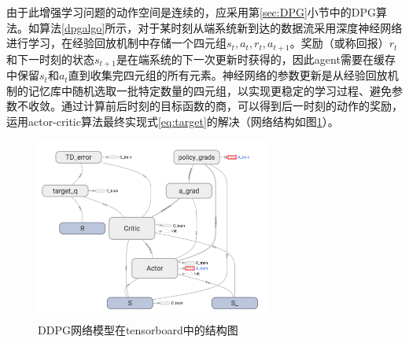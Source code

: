 由于此增强学习问题的动作空间是连续的，应采用第\ref{sec:DPG}小节中的DPG算法。如算法\ref{dpgalgo}所示，对于某时刻从端系统新到达的数据流采用深度神经网络进行学习，在经验回放机制中存储一个四元组${s_t, a_t, r_t, a_{t+1}}$。奖励（或称回报）$r_t$和下一时刻的状态$s_{t+1}$是在端系统的下一次更新时获得的，因此agent需要在缓存中保留$s_t$和$a_t$直到收集完四元组的所有元素。神经网络的参数更新是从经验回放机制的记忆库中随机选取一批特定数量的四元组，以实现更稳定的学习过程、避免参数不收敛。通过计算前后时刻的目标函数的商，可以得到后一时刻的动作的奖励，运用actor-critic算法最终实现式\ref{eq:target}的解决（网络结构如图\ref{fig:ddpg_tensor}）。
\begin{figure}[ht]
\centering
\includegraphics[height=6cm]{figure/DDPG.png}
\caption{DDPG网络模型在tensorboard中的结构图}
\label{fig:ddpg_tensor}
\end{figure}
